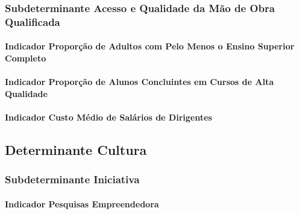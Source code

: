\documentclass[
  12,
  dvipsnames]{article}
\begin{document}
\hypertarget{subdet_obra_qualificada}{%
\subsubsection{Subdeterminante Acesso e Qualidade da Mão de Obra
Qualificada}\label{subdet_obra_qualificada}}

\hypertarget{indicador-proporuxe7uxe3o-de-adultos-com-pelo-menos-o-ensino-superior-completo}{%
\paragraph{Indicador Proporção de Adultos com Pelo Menos o Ensino
Superior
Completo}\label{indicador-proporuxe7uxe3o-de-adultos-com-pelo-menos-o-ensino-superior-completo}}

\hypertarget{indicador-proporuxe7uxe3o-de-alunos-concluintes-em-cursos-de-alta-qualidade}{%
\paragraph{Indicador Proporção de Alunos Concluintes em Cursos de Alta
Qualidade}\label{indicador-proporuxe7uxe3o-de-alunos-concluintes-em-cursos-de-alta-qualidade}}

\hypertarget{indicador-custo-muxe9dio-de-saluxe1rios-de-dirigentes}{%
\paragraph{Indicador Custo Médio de Salários de
Dirigentes}\label{indicador-custo-muxe9dio-de-saluxe1rios-de-dirigentes}}

\hypertarget{determinante-cultura}{%
\subsection{Determinante Cultura}\label{determinante-cultura}}

\hypertarget{subdeterminante-iniciativa}{%
\subsubsection{Subdeterminante
Iniciativa}\label{subdeterminante-iniciativa}}

\hypertarget{indicador-pesquisas-empreendedora}{%
\paragraph{Indicador Pesquisas
Empreendedora}\label{indicador-pesquisas-empreendedora}}
\end{document}

